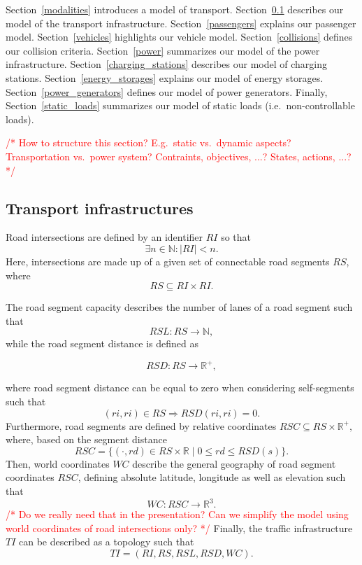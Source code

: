 \documentclass[conference]{IEEEtran}
\newcommand{\todo}[1]{\textcolor{red}{/* #1 */}}
\begin{document}
	
	Section~\ref{modalities} introduces a model of transport. Section~\ref{transport} describes our model of the transport infrastructure. Section~\ref{passengers} explains our passenger model. Section~\ref{vehicles} highlights our vehicle model. Section~\ref{collisions} defines our collision criteria. Section~\ref{power} summarizes our model of the power infrastructure. Section~\ref{charging_stations} describes our model of charging stations. Section~\ref{energy_storages} explains our model of energy storages. Section~\ref{power_generators} defines our model of power generators. Finally, Section~\ref{static_loads} summarizes our model of static loads (i.e.\ non-controllable loads).
	
	\todo{How to structure this section? E.g.\ static vs.\ dynamic aspects? Transportation vs.\ power system? Contraints, objectives, ...? States, actions, ...?}
	
	\subsection{Transport infrastructures}
	\label{transport}
	Road intersections are defined by an identifier $RI$ so that
	\[
	\exists n \in \mathbb{N} : |RI| < n \mathrm{.}
	\]
	Here, intersections are made up of a given set of connectable road segments $RS$, where
	\[
	RS \subseteq RI \times RI \mathrm{.}
	\]
	
	The road segment capacity describes the number of lanes of a road segment such that
	\[
	RSL : RS \rightarrow \mathbb{N} \mathrm{,}
	\]
	while the road segment distance is defined as 
	
	\[
	RSD : RS \rightarrow \mathbb{R}^+ \mathrm{,}
	\]
	
	where road segment distance can be equal to zero when considering self-segments such that
	\[
	(ri, ri) \in RS \Rightarrow  RSD(ri, ri) = 0 \mathrm{.}
	\]
	Furthermore, road segments are defined by relative coordinates $RSC \subseteq RS \times \mathbb{R}^+ \mathrm{,}$ where, based on the segment distance
	\[
	RSC = \{(\cdot, rd) \in RS \times \mathbb{R} \mid 0 \leq rd \leq RSD(s) \} \mathrm{.}
	\]
	Then, world coordinates $WC$ describe the general geography of road segment coordinates $RSC$, defining absolute latitude, longitude as well as elevation such that
	\[
	WC : RSC \rightarrow \mathbb{R}^3 \mathrm{.}
	\]
 \todo{Do we really need that in the presentation? Can we simplify the model using world coordinates of road intersections only?}
	Finally, the traffic infrastructure $TI$ can be described as a topology such that 
	\[
	TI = (RI, RS, RSL, RSD, WC) \mathrm{.}
	\]
	
\end{document}
